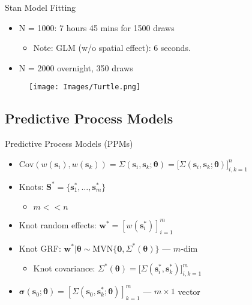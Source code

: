 \documentclass{beamer}
\begin{document}
\begin{frame}{Stan Model Fitting} %
\begin{itemize}
\addtolength{\itemsep}{0.5\baselineskip}
\item N = 1000: 7 hours 45 mins for 1500 draws
  \begin{itemize}
  \item Note: GLM (w/o spatial effect): 6 seconds.
  \end{itemize}
\item N = 2000 overnight, 350 draws
\end{itemize}
  \begin{figure}[H]
	\centering
	\texttt{[image: Images/Turtle.png]}
	\end{figure}
\end{frame}

\subsection{Predictive Process Models}

\begin{frame}{Predictive Process Models (PPMs) }{\citep{Banerjee2008}} %
\begin{itemize}
\addtolength{\itemsep}{1\baselineskip}
\item $\text{Cov}\left(w(\pmb{s}_{i}), w(\pmb{s}_{k}) \right) = \Sigma(\pmb{s}_{i}, \pmb{s}_{k}; \pmb{\theta})= \big[\Sigma(\pmb{s}_{i}, \pmb{s}_{k}; \pmb{\theta}) \big]_{i,k=1}^{n}$
\item Knots: $\pmb{S}^{*} = \{\pmb{s}_{1}^{*}, \dots, \pmb{s}_{m}^{*}\}$
  \begin{itemize}
  \item $m < < n$
  \end{itemize}
\item Knot random effects: $\pmb{w}^{*} = \left[w(\pmb{s}_{i}^{*})\right]_{i=1}^{m}$
\item Knot GRF: $\pmb{w}^{*}|\pmb{\theta} \sim \text{MVN}\{\pmb{0}, \Sigma^{*}(\pmb{\theta})\}$ --- $m$-dim \\
  \begin{itemize}
  \addtolength{\itemsep}{0.5\baselineskip}
  \item Knot covariance: $\Sigma^{*}(\pmb{\theta}) = \big[\Sigma(\pmb{s}_{i}^{*}, \pmb{s}_{k}^{*})\big]_{i,k = 1}^{m}$
  \end{itemize}
\item $\pmb{\sigma}(\pmb{s}_{0};\pmb{\theta}) = \left[\Sigma(\pmb{s}_{0}, \pmb{s}_{k}^{*}; \pmb{\theta})\right]_{k = 1}^{m}$ --- $m \times 1$ vector
\end{itemize}
\end{frame}
\end{document}
